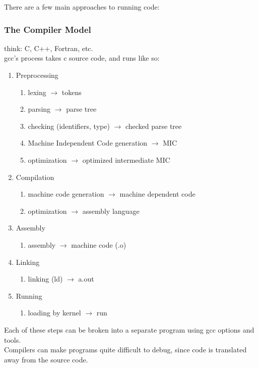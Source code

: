 \documentclass[../../lecture_notes.tex]{subfiles}
\begin{document}
\noindent There are a few main approaches to running code:
\subsubsection*{The Compiler Model}
think: C, C++, Fortran, etc.\\
gcc's process takes c source code, and runs like so: \begin{enumerate} [itemsep=0mm]
	\item Preprocessing
		\begin{enumerate} [itemsep=0mm]
			\item lexing $\rightarrow$ tokens
			\item parsing $\rightarrow$ parse tree
			\item checking (identifiers, type) $\rightarrow$ checked parse tree
			\item Machine Independent Code generation $\rightarrow$ MIC
			\item optimization $\rightarrow$ optimized intermediate MIC
		\end{enumerate}
	\item Compilation
		\begin{enumerate} [itemsep=0mm]
			\item machine code generation $\rightarrow$ machine dependent code
			\item optimization $\rightarrow$ assembly language
		\end{enumerate}
	\item Assembly
		\begin{enumerate} [itemsep=0mm]
			\item assembly $\rightarrow$ machine code (.o)
		\end{enumerate}
	\item Linking
		\begin{enumerate} [itemsep=0mm]
			\item linking (ld) $\rightarrow$ a.out
		\end{enumerate}
	\item Running
		\begin{enumerate} [itemsep=0mm]
			\item loading by kernel $\rightarrow$ run
		\end{enumerate} 
	\end{enumerate}
Each of these steps can be broken into a separate program using gcc options and tools.\\
Compilers can make programs quite difficult to debug, since code is translated away from the source code.\\
\end{document}
